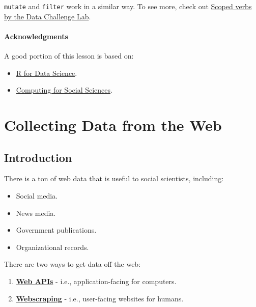 \documentclass[]{book}
\providecommand{\tightlist}{%
  \setlength{\itemsep}{0pt}\setlength{\parskip}{0pt}}
\begin{document}
\texttt{mutate} and \texttt{filter} work in a similar way. To see more,
check out
\href{https://dcl-2017-04.github.io/curriculum/manip-scoped.html}{Scoped
verbs by the Data Challenge Lab}.

\subsubsection*{Acknowledgments}\label{acknowledgments-5}

A good portion of this lesson is based on:

\begin{itemize}
\tightlist
\item
  \href{https://r4ds.had.co.nz/}{R for Data Science}.
\item
  \href{https://cfss.uchicago.edu}{Computing for Social Sciences}.
\end{itemize}

\chapter{Collecting Data from the
Web}\label{collecting-data-from-the-web}

\section{Introduction}\label{introduction-1}

There is a ton of web data that is useful to social scientists,
including:

\begin{itemize}
\tightlist
\item
  Social media.
\item
  News media.
\item
  Government publications.
\item
  Organizational records.
\end{itemize}

There are two ways to get data off the web:

\begin{enumerate}
\def\labelenumi{\arabic{enumi}.}
\tightlist
\item
  \textbf{\protect\hyperlink{web-apis}{Web APIs}} - i.e.,
  application-facing for computers.
\item
  \textbf{\protect\hyperlink{webscraping}{Webscraping}} - i.e.,
  user-facing websites for humans.
\end{enumerate}
\end{document}
